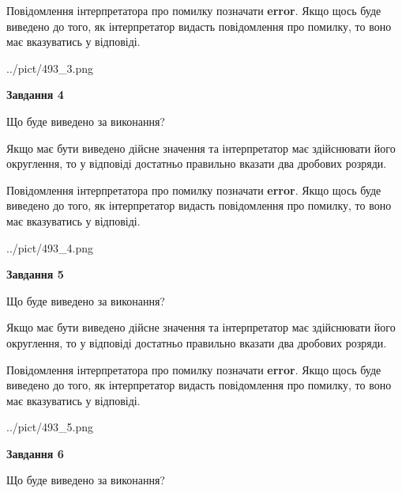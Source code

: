 \documentclass[12pt, ukrainian]{article}
\begin{document}
{\begin {Large}
Повідомлення інтерпретатора про помилку позначати \textbf{error}.
Якщо щось буде виведено до того, як інтерпретатор видасть повідомлення про помилку, 
то воно має вказуватись у відповіді. \par

\begin{center}
	{../pict/493_3.png}
\end{center}
\newpage

{\begin {center}\textbf{Завдання 4}\end {center}}\par
Що буде виведено за виконання? \par

Якщо має бути виведено дійсне значення та інтерпретатор має здійснювати його округлення, 
то у відповіді достатньо правильно вказати два дробових розряди.

Повідомлення інтерпретатора про помилку позначати \textbf{error}.
Якщо щось буде виведено до того, як інтерпретатор видасть повідомлення про помилку, 
то воно має вказуватись у відповіді. \par

\begin{center}
	{../pict/493_4.png}
\end{center}
\newpage

{\begin {center}\textbf{Завдання 5}\end {center}}\par
Що буде виведено за виконання? \par

Якщо має бути виведено дійсне значення та інтерпретатор має здійснювати його округлення, 
то у відповіді достатньо правильно вказати два дробових розряди.

Повідомлення інтерпретатора про помилку позначати \textbf{error}.
Якщо щось буде виведено до того, як інтерпретатор видасть повідомлення про помилку, 
то воно має вказуватись у відповіді. \par

\begin{center}
	{../pict/493_5.png}
\end{center}
\newpage

{\begin {center}\textbf{Завдання 6}\end {center}}\par
Що буде виведено за виконання? \par


\end{Large}}
\end{document}
